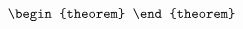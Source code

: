 \documentclass[aos,preprint]{imsart}
\begin{document}
\begin{frontmatter}
\begin{equation}
\begin{theorem}
	 \end{theorem}

\iffalse
 We need to state a result for Gaussian matrix ...... Consider
$$f (\al,n_1,n_2)= \frac1p\tr\left[\frac{1}{ (X_1^\top X_1 + \al \cdot X_2^\top X_2)^2} (X_1^\top X_1)^2\right].$$
In our case, we have $\al=1$, but we can handle more general $\al$. We introduce two parameters:
$$a= \al \frac{n_2}{n_1} \left( \frac{p}{n_1} + \frac{p}{n_2}- \frac{p}{n_1 }\cdot \frac{p}{n_2}\right),\quad b= \al \frac{n_2}{n_1}\left( 1- \frac{p}{n_2}\right) + \left( 1- \frac{p}{n_1}\right). $$
Then we define the following parameters:
\begin{align*}
x= \frac{-b+ \sqrt{b^2 + 4a}}{2a},\quad y= \left[ x^{-2} - \frac{p}{n_1}\left( 1+\frac{p}{n_1}x\right)^{-2}\right]^{-1},\quad \omega= \al\frac{n_2}{n_1} \left( 1 + \al \frac{p}{n_1}x\right)^{-1}.
\end{align*}
We have that
$$f(\al,n_1,n_2)= \frac{1 - 2\omega x + \omega^2 y}{ 1 - \frac{p}{n_2} \cdot \omega^2 y } +\oo(1)\quad \text{w.h.p.} $$
In the setting $\al=1$, both $\omega x$ and $\omega^2 y$ can be written in terms of only one parameter
$$u: = x^{-1}\left(1+\frac{p}{n_1}x\right)=   \frac{ b+\sqrt{b^2+4a}}{2} +\frac{p}{n_1}   .$$
\fi


\end{equation}
\end{frontmatter}
\end{document}
